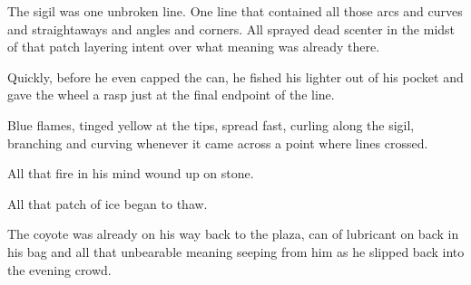 The sigil was one unbroken line. One line that contained all those arcs and curves and straightaways and angles and corners. All sprayed dead scenter in the midst of that patch layering intent over what meaning was already there.

Quickly, before he even capped the can, he fished his lighter out of his pocket and gave the wheel a rasp just at the final endpoint of the line.

Blue flames, tinged yellow at the tips, spread fast, curling along the sigil, branching and curving whenever it came across a point where lines crossed.

All that fire in his mind wound up on stone.

All that patch of ice began to thaw.

The coyote was already on his way back to the plaza, can of lubricant on back in his bag and all that unbearable meaning seeping from him as he slipped back into the evening crowd.

